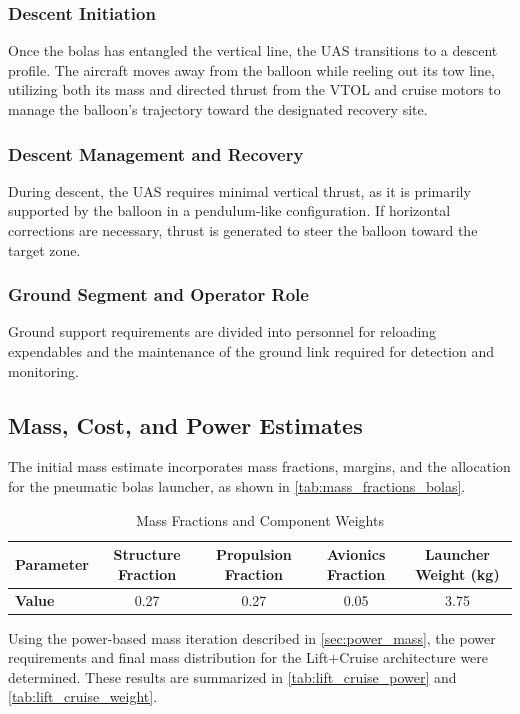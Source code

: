 \subsubsection{Descent Initiation}
Once the bolas has entangled the vertical line, the UAS transitions to a descent profile. The aircraft moves away from the balloon while reeling out its tow line, utilizing both its mass and directed thrust from the VTOL and cruise motors to manage the balloon's trajectory toward the designated recovery site.

\subsubsection{Descent Management and Recovery}
During descent, the UAS requires minimal vertical thrust, as it is primarily supported by the balloon in a pendulum-like configuration. If horizontal corrections are necessary, thrust is generated to steer the balloon toward the target zone.

\subsubsection{Ground Segment and Operator Role}
Ground support requirements are divided into personnel for reloading expendables and the maintenance of the ground link required for detection and monitoring.

\subsection{Mass, Cost, and Power Estimates}
The initial mass estimate incorporates mass fractions, margins, and the allocation for the pneumatic bolas launcher, as shown in \autoref{tab:mass_fractions_bolas}.

\begin{table}[htbp]
\centering
\caption{Mass Fractions and Component Weights}
\label{tab:mass_fractions_bolas}
\begin{tabular}{lcccc}
\toprule
\textbf{Parameter} & Structure Fraction & Propulsion Fraction & Avionics Fraction & Launcher Weight (kg) \\
\midrule
\textbf{Value} & 0.27 & 0.27 & 0.05 & 3.75 \\
\bottomrule
\end{tabular}
\end{table}

Using the power-based mass iteration described in \autoref{sec:power_mass}, the power requirements and final mass distribution for the Lift+Cruise architecture were determined. These results are summarized in \autoref{tab:lift_cruise_power} and \autoref{tab:lift_cruise_weight}.

